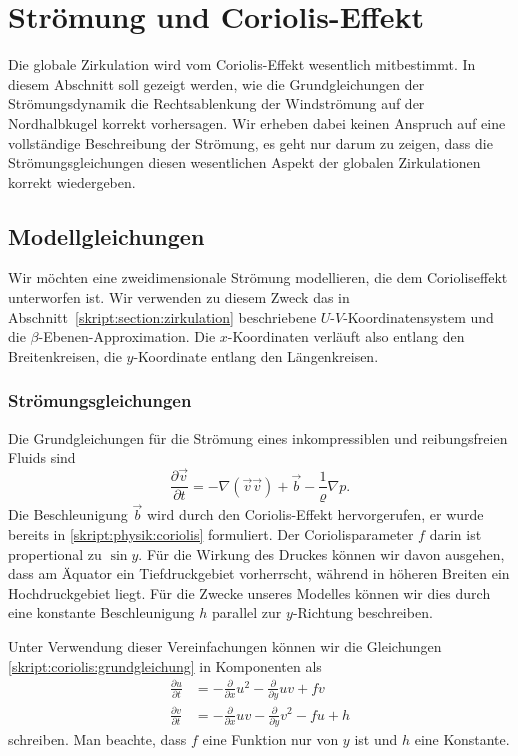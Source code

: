 %
%
%
\section{Strömung und Coriolis-Effekt}
Die globale Zirkulation wird vom Coriolis-Effekt wesentlich mitbestimmt.
In diesem Abschnitt soll gezeigt werden, wie die Grundgleichungen der
Strömungsdynamik die Rechtsablenkung der Windströmung auf der Nordhalbkugel
korrekt vorhersagen.
Wir erheben dabei keinen Anspruch auf eine vollständige Beschreibung
der Strömung, es geht nur darum zu zeigen, dass die Strömungsgleichungen
diesen wesentlichen Aspekt der globalen Zirkulationen korrekt
wiedergeben.

\subsection{Modellgleichungen}
Wir möchten eine zweidimensionale Strömung modellieren, die dem
Corioliseffekt unterworfen ist.
Wir verwenden zu diesem Zweck das in Abschnitt~\ref{skript:section:zirkulation}
beschriebene $U$-$V$-Koordinatensystem und die $\beta$-Ebenen-Approximation.
Die $x$-Koordinaten verläuft also entlang den Breitenkreisen, die 
$y$-Koordinate entlang den Längenkreisen.

\subsubsection{Strömungsgleichungen}
Die Grundgleichungen für die Strömung eines inkompressiblen und reibungsfreien
Fluids sind
\begin{equation}
\frac{\partial\vec v}{\partial t}
=
-\nabla (\vec{v}\vec{v})
+\vec{b} -\frac1{\varrho}\nabla p.
\label{skript:coriolis:grundgleichung}
\end{equation}
Die Beschleunigung $\vec{b}$ wird durch den Coriolis-Effekt hervorgerufen,
er wurde bereits in \eqref{skript:physik:coriolis} formuliert.
Der Coriolisparameter $f$ darin ist propertional zu $\sin y$.
Für die Wirkung des Druckes können wir davon ausgehen, dass
am Äquator ein Tiefdruckgebiet vorherrscht, während in höheren Breiten
ein Hochdruckgebiet liegt.
Für die Zwecke unseres Modelles können wir dies durch eine konstante
Beschleunigung $h$ parallel zur $y$-Richtung beschreiben.

Unter Verwendung dieser Vereinfachungen können wir die Gleichungen
\eqref{skript:coriolis:grundgleichung}
in Komponenten als
\begin{align}
\frac{\partial u}{\partial t}
&=
-\frac{\partial}{\partial x}u^2
-
\frac{\partial}{\partial y}uv
+
fv
\label{skript:coriolis:dudt}
\\
\frac{\partial v}{\partial t}
&=
-\frac{\partial}{\partial x}uv
-
\frac{\partial}{\partial y}v^2
-
fu
+
h
\label{skript:coriolis:dvdt}
\end{align}
schreiben.
Man beachte, dass $f$ eine Funktion nur von $y$ ist und $h$ eine Konstante.

